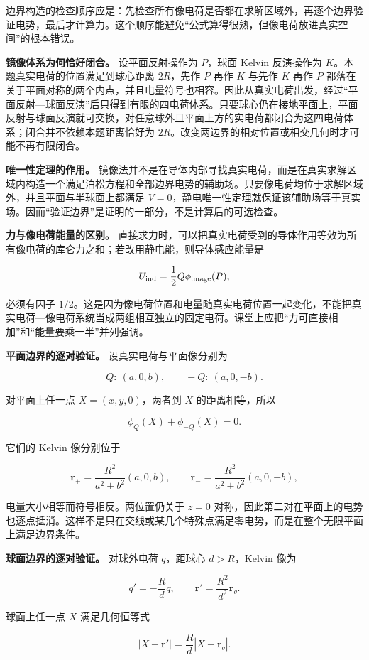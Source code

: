 \documentclass[12pt,a4paper,UTF8]{ctexart}
\begin{document}
边界构造的检查顺序应是：先检查所有像电荷是否都在求解区域外，再逐个边界验证电势，最后才计算力。这个顺序能避免``公式算得很熟，但像电荷放进真实空间''的根本错误。

\textbf{镜像体系为何恰好闭合。} 设平面反射操作为 \(P\)，球面 Kelvin
反演操作为 \(K\)。本题真实电荷的位置满足到球心距离 \(2R\)，先作 \(P\)
再作 \(K\) 与先作 \(K\) 再作 \(P\)
都落在关于平面对称的两个内点，并且电量符号也相容。因此从真实电荷出发，经过``平面反射---球面反演''后只得到有限的四电荷体系。只要球心仍在接地平面上，平面反射与球面反演就可交换，对任意球外且平面上方的实电荷都闭合为这四电荷体系；闭合并不依赖本题距离恰好为
\(2R\)。改变两边界的相对位置或相交几何时才可能不再有限闭合。

\textbf{唯一性定理的作用。}
镜像法并不是在导体内部寻找真实电荷，而是在真实求解区域内构造一个满足泊松方程和全部边界电势的辅助场。只要像电荷均位于求解区域外，并且平面与半球面上都满足
\(V=0\)，静电唯一性定理就保证该辅助场等于真实场。因而``验证边界''是证明的一部分，不是计算后的可选检查。

\textbf{力与像电荷能量的区别。}
直接求力时，可以把真实电荷受到的导体作用等效为所有像电荷的库仑力之和；若改用静电能，则导体感应能量是

\[
U_{\rm ind}=\frac12Q\phi_{\rm image}(P),
\]

必须有因子
\(1/2\)。这是因为像电荷位置和电量随真实电荷位置一起变化，不能把真实电荷---像电荷系统当成两组相互独立的固定电荷。课堂上应把``力可直接相加''和``能量要乘一半''并列强调。

\textbf{平面边界的逐对验证。} 设真实电荷与平面像分别为

\[
Q:\ (a,0,b),
\qquad
-Q:\ (a,0,-b).
\]

对平面上任一点 \(X=(x,y,0)\)，两者到 \(X\) 的距离相等，所以

\[
\phi_{Q}(X)+\phi_{-Q}(X)=0.
\]

它们的 Kelvin 像分别位于

\[
\bm r_+=\frac{R^2}{a^2+b^2}(a,0,b),
\qquad
\bm r_- =\frac{R^2}{a^2+b^2}(a,0,-b),
\]

电量大小相等而符号相反。两位置仍关于 \(z=0\)
对称，因此第二对在平面上的电势也逐点抵消。这样不是只在交线或某几个特殊点满足零电势，而是在整个无限平面上满足边界条件。

\textbf{球面边界的逐对验证。} 对球外电荷 \(q\)，距球心 \(d>R\)，Kelvin
像为

\[
q'=-\frac Rdq,
\qquad
\bm r'=\frac{R^2}{d^2}\bm r_q.
\]

球面上任一点 \(X\) 满足几何恒等式

\[
|X-\bm r'|=\frac Rd|X-\bm r_q|.
\]
\end{document}
